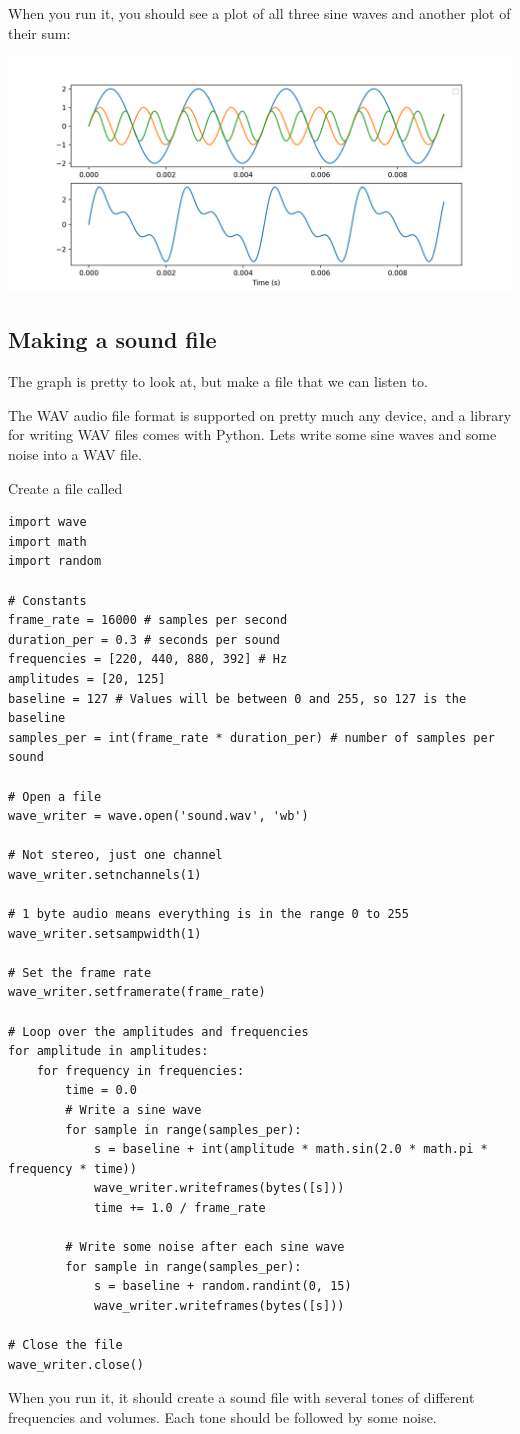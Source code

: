 When you run it, you should see a plot of all three sine waves and another plot of their sum:

\includegraphics[width=0.9\linewidth]{harmonicspy.png}

\subsection{Making a sound file}

The graph is pretty to look at, but make a file that we can listen to.

The WAV audio file format is supported on pretty much any device, and
a library for writing WAV files comes with Python.  Lets write some
sine waves and some noise into a WAV file.

Create a file called 

\begin{Verbatim}
import wave
import math
import random

# Constants
frame_rate = 16000 # samples per second
duration_per = 0.3 # seconds per sound
frequencies = [220, 440, 880, 392] # Hz
amplitudes = [20, 125]
baseline = 127 # Values will be between 0 and 255, so 127 is the baseline
samples_per = int(frame_rate * duration_per) # number of samples per sound

# Open a file
wave_writer = wave.open('sound.wav', 'wb')

# Not stereo, just one channel
wave_writer.setnchannels(1)

# 1 byte audio means everything is in the range 0 to 255
wave_writer.setsampwidth(1)

# Set the frame rate
wave_writer.setframerate(frame_rate)

# Loop over the amplitudes and frequencies
for amplitude in amplitudes:
    for frequency in frequencies:
        time = 0.0
        # Write a sine wave
        for sample in range(samples_per):
            s = baseline + int(amplitude * math.sin(2.0 * math.pi * frequency * time))
            wave_writer.writeframes(bytes([s]))
            time += 1.0 / frame_rate
            
        # Write some noise after each sine wave
        for sample in range(samples_per):
            s = baseline + random.randint(0, 15)
            wave_writer.writeframes(bytes([s]))
            
# Close the file
wave_writer.close()
\end{Verbatim}

When you run it, it should create a sound file with several tones of
different frequencies and volumes. Each tone should be followed by
some noise.
